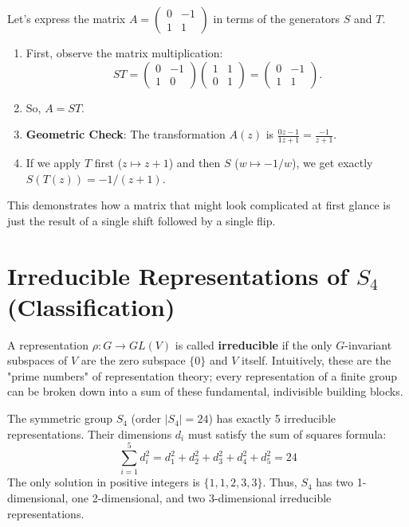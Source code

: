 \begin{example}
Let's express the matrix $A = \begin{pmatrix} 0 & -1 \\ 1 & 1 \end{pmatrix}$ in terms of the generators $S$ and $T$.
\begin{enumerate}
    \item First, observe the matrix multiplication:
    \[ ST = \begin{pmatrix} 0 & -1 \\ 1 & 0 \end{pmatrix} \begin{pmatrix} 1 & 1 \\ 0 & 1 \end{pmatrix} = \begin{pmatrix} 0 & -1 \\ 1 & 1 \end{pmatrix}. \]
    \item So, $A = ST$.
    \item \textbf{Geometric Check}: The transformation $A(z)$ is $\frac{0z - 1}{1z + 1} = \frac{-1}{z+1}$. 
    \item If we apply $T$ first ($z \mapsto z+1$) and then $S$ ($w \mapsto -1/w$), we get exactly $S(T(z)) = -1/(z+1)$.
\end{enumerate}
This demonstrates how a matrix that might look complicated at first glance is just the result of a single shift followed by a single flip.
\end{example}

\section{Irreducible Representations of $S_4$ (Classification)}

\begin{definition}
A representation $\rho: G \to GL(V)$ is called \textbf{irreducible} if the only $G$-invariant subspaces of $V$ are the zero subspace $\{0\}$ and $V$ itself. Intuitively, these are the "prime numbers" of representation theory; every representation of a finite group can be broken down into a sum of these fundamental, indivisible building blocks.
\end{definition}

\begin{theorem}
The symmetric group $S_4$ (order $|S_4| = 24$) has exactly 5 irreducible representations. Their dimensions $d_i$ must satisfy the sum of squares formula:
\[ \sum_{i=1}^5 d_i^2 = d_1^2 + d_2^2 + d_3^2 + d_4^2 + d_5^2 = 24 \]
The only solution in positive integers is $\{1, 1, 2, 3, 3\}$. Thus, $S_4$ has two 1-dimensional, one 2-dimensional, and two 3-dimensional irreducible representations.
\end{theorem}

